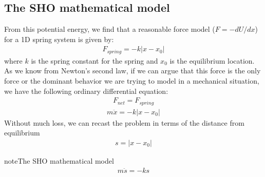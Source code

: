\documentclass[letterpaper,10pt,english]{jupyterBook}
\begin{document}
\subsection{The SHO mathematical model}
\label{\detokenize{content/2_oscillations/readings-oscillators:the-sho-mathematical-model}}
\sphinxAtStartPar
From this potential energy, we find that a reasonable force model (\(F = -dU/dx\)) for a 1D spring system is given by:
\begin{equation*}
\begin{split}F_{spring} = -k |x-x_0|\end{split}
\end{equation*}
\sphinxAtStartPar
where \(k\) is the spring constant for the spring and \(x_0\) is the equilibrium location. As we know from Newton’s second law, if we can argue that this force is the only force or the dominant behavior we are trying to model in a mechanical situation, we have the following ordinary differential equation:
\begin{equation*}
\begin{split}F_{net} = F_{spring}\end{split}
\end{equation*}\begin{equation*}
\begin{split}m\ddot{x} = -k|x-x_0|\end{split}
\end{equation*}
\sphinxAtStartPar
Without much loss, we can recast the problem in terms of the distance from equilibrium
\begin{equation*}
\begin{split}s=|x-x_0|\end{split}
\end{equation*}
\sphinxAtStartPar
{}

\begin{sphinxadmonition}{note}{The SHO mathematical model}
\begin{equation*}
\begin{split}m\ddot{s} = -ks\end{split}
\end{equation*}\end{sphinxadmonition}
\end{document}
